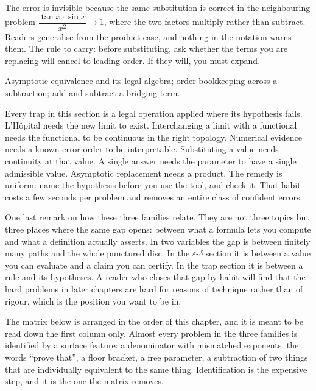 \begin{trap}
The error is invisible because the same substitution is correct in the neighbouring problem $\dfrac{\tan x\cdot\sin x}{x^{2}}\to1$, where the two factors multiply rather than subtract. Readers generalise from the product case, and nothing in the notation warns them. The rule to carry: before substituting, ask whether the terms you are replacing will cancel to leading order. If they will, you must expand.
\end{trap}

\begin{seealsob}Asymptotic equivalence and its legal algebra; order bookkeeping across a subtraction; add and subtract a bridging term.\end{seealsob}

\begin{keynote}
Every trap in this section is a legal operation applied where its hypothesis fails. L'H\^opital needs the new limit to exist. Interchanging a limit with a functional needs the functional to be continuous in the right topology. Numerical evidence needs a known error order to be interpretable. Substituting a value needs continuity at that value. A single answer needs the parameter to have a single admissible value. Asymptotic replacement needs a product. The remedy is uniform: name the hypothesis before you use the tool, and check it. That habit costs a few seconds per problem and removes an entire class of confident errors.
\end{keynote}

One last remark on how these three families relate. They are not three topics but three places where the same gap opens: between what a formula lets you compute and what a definition actually asserts. In two variables the gap is between finitely many paths and the whole punctured disc. In the $\varepsilon$-$\delta$ section it is between a value you can evaluate and a claim you can certify. In the trap section it is between a rule and its hypotheses. A reader who closes that gap by habit will find that the hard problems in later chapters are hard for reasons of technique rather than of rigour, which is the position you want to be in.

The matrix below is arranged in the order of this chapter, and it is meant to be read down the first column only. Almost every problem in the three families is identified by a surface feature: a denominator with mismatched exponents, the words ``prove that'', a floor bracket, a free parameter, a subtraction of two things that are individually equivalent to the same thing. Identification is the expensive step, and it is the one the matrix removes.

